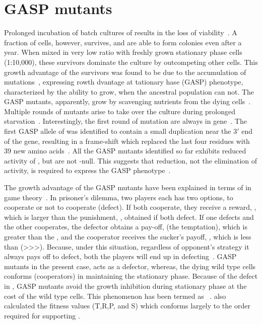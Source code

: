 \section{GASP mutants}
\label{chap1:gasp} Prolonged incubation of batch cultures of
 results in the loss of viability~\citep[reviewed
in][]{Huisman1996,Finkel1998}. A fraction of cells, however,
survives, and are able to form colonies even after a year. When
mixed in very low ratio with freshly grown stationary phase cells
(1:10,000), these survivors dominate the culture by outcompeting
other cells. This growth advantage of the survivors was found to
be due to the accumulation of mutations~\citep{Zambrano1993},
expressing rowth dvantage at tationary hase
(GASP) phenotype, characterized by the ability to grow, when the
ancestral population can not. The GASP mutants, apparently, grow
by scavenging nutrients from the dying cells~\citep{Zinser1999}.
Multiple rounds of mutants arise to take over the culture during
prolonged starvation~\citep{Finkel1999}. Interestingly, the first
round of mutation are always in  gene~\citep{Vulic2001}.
The first GASP allele of  was identified to contain a
small duplication near the 3$'$ end of the gene, resulting in a
frame-shift which replaced the last four residues with 39 new
amino acids~\citep{Zambrano1993}. All the GASP mutants identified
so far exhibits reduced activity of , but are not
-null. This suggests that reduction, not the elimination
of  activity, is required to express the GASP
phenotype~\citep{Finkel1998}.

The growth advantage of the GASP mutants have been explained in
terms of  in game
theory~\citep{Axelrod1981,Vulic2001}. In prisoner's dilemma, two
players each has two options, to cooperate or not to cooperate
(defect). If both cooperate, they receive a reward, , which
is larger than the punishment, , obtained if both defect. If
one defects and the other cooperates, the defector obtains a
pay-off,  (the temptation), which is greater than the ,
and the cooperator receives the sucker's payoff, , which is
less than  (>>>). Because, under this
situation, regardless of opponent's strategy it always pays off to
defect, both the players will end up in
defecting~\citep{Axelrod1981}. GASP mutants in the present case,
acts as a defector, whereas, the dying wild type cells conforms
(cooperators) in maintaining the stationary phase. Because of the
defect in , GASP mutants avoid the growth inhibition
during stationary phase at the cost of the wild type cells. This
phenomenon has been termed as ~\citep{Vulic2001}. \citet{Vulic2001} also calculated the
fitness values (T,R,P, and S) which conforms largely to the order
required for supporting .

